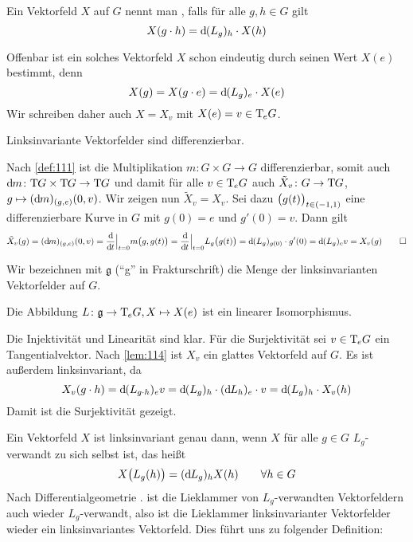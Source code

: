 \begin{definition}[{name=[linksinvariantes Vektorfeld]}]
	Ein Vektorfeld $X$ auf $G$ nennt man , falls für alle $g,h \in G$ gilt
	\[
		X(g \cdot h) = \mathd(L_g)_h \cdot X(h)
	\]
\end{definition}

Offenbar ist ein solches Vektorfeld $X$ schon eindeutig durch seinen Wert $X(e)$ bestimmt, denn 
\[
	X(g) = X(g \cdot e) = \mathd(L_g)_e \cdot X(e)
\]
Wir schreiben daher auch $X=X_v$ mit $X(e)=v \in \Tmap_e G$.

\begin{lemma}[label=lem:114,{name=[Linksinvariante Vektorfelder sind differenzierbar]}]
	Linksinvariante Vektorfelder sind differenzierbar.
\end{lemma}
\begin{beweis}
	Nach \autoref{def:111} ist die Multiplikation $m \colon G \times G \to G$ differenzierbar, somit auch $\mathd m \colon \Tmap G \times \Tmap G \to\Tmap G$ und damit für alle $v \in \Tmap_e G$ auch $\tilde{X}_v \colon G \to \Tmap G$, $g \mapsto (\mathd m)_{(g,e)}(0,v)$.
	Wir zeigen nun $\tilde{X}_v=X_v$.
	Sei dazu $\enbrace[\big]{g(t)}_{t \in (-1,1)}$ eine differenzierbare Kurve in $G$ mit $g(0)=e$ und $g'(0)=v$.
	Dann gilt 
	\[
		\tilde{X}_v(g)=(\mathd m)_{(g,e)}(0,v) = \diffd{}{t}\Big|_{t=0} m \enbrace[\big]{g,g(t)} = \diffd{}{t}\Big|_{t=0} L_g\enbrace[\big]{g(t)} = \mathd(L_g)_{g(0)} \cdot g'(0)
		 =\mathd(L_g)_e v = X_v(g) \qedhere
	\]
\end{beweis}

Wir bezeichnen mit $\mathfrak{g}$ (\enquote{g} in Frakturschrift) die Menge der linksinvarianten Vektorfelder auf $G$.

\begin{korollar}[{name=[{Isomorphismus linkinv. Vektorfelder und Tangentialraum an $e$}]}]
	Die Abbildung $L \colon \mathfrak{g} \to \Tmap_e G, X \mapsto X(e)$ ist ein linearer Isomorphismus.
\end{korollar}
\begin{beweis}
	Die Injektivität und Linearität sind klar.
	Für die Surjektivität sei $v \in \Tmap_e G$ ein Tangentialvektor.
	Nach \autoref{lem:114} ist $X_v$ ein glattes Vektorfeld auf $G$. 
	Es ist außerdem linksinvariant, da
	\[
		X_v(g \cdot h) = \mathd(L_{g \cdot h})_e v = \mathd(L_g)_h \cdot (\mathd L_h)_e \cdot v = \mathd (L_g)_h \cdot X_v(h)
	\]
	Damit ist die Surjektivität gezeigt.
\end{beweis}

Ein Vektorfeld $X$ ist linksinvariant genau dann, wenn $X$ für alle $g \in G$ $L_g$-verwandt zu sich selbst ist, das heißt
\[
	X \enbrace[\big]{L_g(h)} = (\mathd L_g)_h X(h) \qquad  \forall h \in G
\]
Nach Differentialgeometrie . ist die Lieklammer von $L_g$-verwandten Vektorfeldern auch wieder $L_g$-verwandt, also ist die Lieklammer linksinvarianter Vektorfelder wieder ein linksinvariantes Vektorfeld.
Dies führt uns zu folgender Definition:


